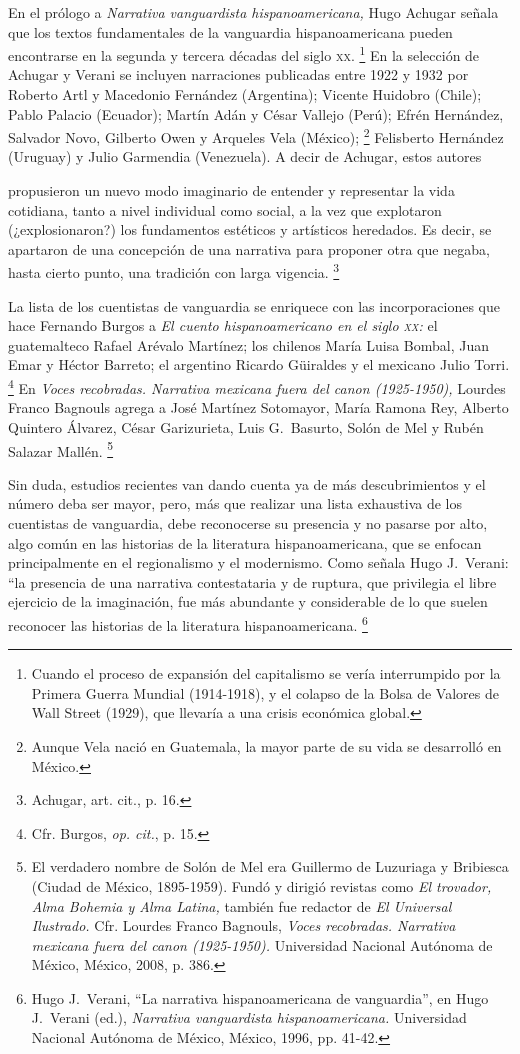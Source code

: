 \documentclass[14pt,twoside,final]{extbook} %
\let\oldfootnote\footnote
\renewcommand\footnote[1]{%
\oldfootnote{\hspace{1mm}#1}}
\begin{document}
En el prólogo a \emph{Narrativa vanguardista hispanoamericana,} Hugo Achugar señala que los textos fundamentales de la vanguardia hispanoamericana pueden encontrarse en la segunda y tercera décadas del siglo \textsc{xx}.\footnote{Cuando el proceso de expansión del capitalismo se vería interrumpido por la Primera Guerra Mundial (1914-1918), y el colapso de la Bolsa de Valores de Wall Street (1929), que llevaría a una crisis económica global.} En la selección de Achugar y Verani se incluyen narraciones publicadas entre 1922 y 1932 por Roberto Artl y Macedonio Fernández (Argentina); Vicente Huidobro (Chile); Pablo Palacio (Ecuador); Martín Adán y César Vallejo (Perú); Efrén Hernández, Salvador Novo, Gilberto Owen y Arqueles Vela (México);\footnote{Aunque Vela nació en Guatemala, la mayor parte de su vida se desarrolló en México.} Felisberto Hernández (Uruguay) y Julio Garmendia (Venezuela). A decir de Achugar, estos autores
\begin{quoting}
propusieron un nuevo modo imaginario de entender y representar la vida cotidiana, tanto a nivel individual como social, a la vez que explotaron (¿explosionaron?) los fundamentos estéticos y artísticos heredados. Es decir, se apartaron de una concepción de una narrativa para proponer otra que negaba, hasta cierto punto, una tradición con larga vigencia.\footnote{Achugar, art. cit., p. 16.}
\end{quoting}
La lista de los cuentistas de vanguardia se enriquece con las incorporaciones que hace Fernando Burgos a \emph{El cuento hispanoamericano en el siglo \textsc{xx}:} el guatemalteco Rafael Arévalo Martínez; los chilenos María Luisa Bombal, Juan Emar y Héctor Barreto; el argentino Ricardo Güiraldes y el mexicano Julio Torri.\footnote{Cfr. Burgos, \emph{op. cit.}, p. 15.} En \emph{Voces recobradas. Narrativa mexicana fuera del canon (\mbox{1925-1950}),} Lourdes Franco Bagnouls agrega a José Martínez Sotomayor, María Ramona Rey, Alberto Quintero Álvarez, César Garizurieta, Luis G.~Basurto, Solón de Mel y Rubén Salazar Mallén.\footnote{El verdadero nombre de Solón de Mel era Guillermo de Luzuriaga y Bribiesca (Ciudad de México, 1895-1959). Fundó y dirigió revistas como \textit{El trovador, Alma Bohemia \emph{y} Alma Latina,} también fue redactor de \emph{El Universal Ilustrado.} Cfr. Lourdes Franco Bagnouls, \emph{Voces recobradas. Narrativa mexicana fuera del canon (1925-1950).} Universidad Nacional Autónoma de México, México, 2008, p. 386.}

Sin duda, estudios recientes van dando cuenta ya de más descubrimientos y el número deba ser mayor, pero, más que realizar una lista exhaustiva de los cuentistas de vanguardia, debe reconocerse su presencia y no pasarse por alto, algo común en las historias de la literatura hispanoamericana, que se enfocan principalmente en el regionalismo y el modernismo. Como señala Hugo J.~Verani: ``la presencia de una narrativa contestataria y de ruptura, que privilegia el libre ejercicio de la imaginación, fue más abundante y considerable de lo que suelen reconocer las historias de la literatura hispanoamericana.\footnote{Hugo J.~Verani, ``La narrativa hispanoamericana de vanguardia'', en Hugo J.~Verani (ed.), \emph{Narrativa vanguardista hispanoamericana.} Universidad Nacional Autónoma de México, México, 1996, pp. 41-42.}
\end{document}

